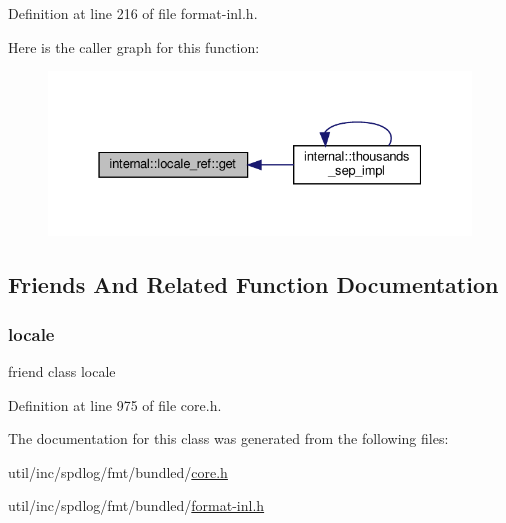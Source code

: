 Definition at line 216 of file format-\/inl.\+h.

Here is the caller graph for this function\+:
\nopagebreak
\begin{figure}[H]
\begin{center}
\leavevmode
\includegraphics[width=331pt]{classinternal_1_1locale__ref_a25f8bf16278b8cd7c083aae1a11c49e0_icgraph}
\end{center}
\end{figure}


\subsection{Friends And Related Function Documentation}
\mbox{\label{classinternal_1_1locale__ref_a0a09223e17db306b813d8b07b4b344fc}} 
\subsubsection{\texorpdfstring{locale}{locale}}
{\footnotesize\ttfamily friend class locale\hspace{0.3cm}{\ttfamily [friend]}}



Definition at line 975 of file core.\+h.



The documentation for this class was generated from the following files\+:\begin{DoxyCompactItemize}
\item 
util/inc/spdlog/fmt/bundled/\hyperlink{core_8h}{core.\+h}\item 
util/inc/spdlog/fmt/bundled/\hyperlink{format-inl_8h}{format-\/inl.\+h}\end{DoxyCompactItemize}
